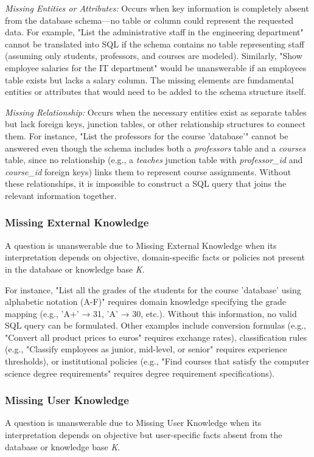 \textit{Missing Entities or Attributes:} Occurs when key information is completely absent from the database schema—no table or column could represent the requested data. For example, "List the administrative staff in the engineering department" cannot be translated into SQL if the schema contains no table representing staff (assuming only students, professors, and courses are modeled). Similarly, "Show employee salaries for the IT department" would be unanswerable if an employees table exists but lacks a salary column. The missing elements are fundamental entities or attributes that would need to be added to the schema structure itself.

\textit{Missing Relationship:} Occurs when the necessary entities exist as separate tables but lack foreign keys, junction tables, or other relationship structures to connect them. For instance, "List the professors for the course 'database'" cannot be answered even though the schema includes both a \textit{professors} table and a \textit{courses} table, since no relationship (e.g., a \textit{teaches} junction table with \textit{professor\_id} and \textit{course\_id} foreign keys) links them to represent course assignments. Without these relationships, it is impossible to construct a SQL query that joins the relevant information together.

\subsubsection{Missing External Knowledge}
A question is unanswerable due to Missing External Knowledge when its interpretation depends on objective, domain-specific facts or policies not present in the database or knowledge base \textit{K}.

For instance, "List all the grades of the students for the course 'database' using alphabetic notation (A-F)" requires domain knowledge specifying the grade mapping (e.g., 'A+' → 31, 'A' → 30, etc.). Without this information, no valid SQL query can be formulated. Other examples include conversion formulas (e.g., "Convert all product prices to euros" requires exchange rates), classification rules (e.g., "Classify employees as junior, mid-level, or senior" requires experience thresholds), or institutional policies (e.g., "Find courses that satisfy the computer science degree requirements" requires degree requirement specifications).

\subsubsection{Missing User Knowledge}
A question is unanswerable due to Missing User Knowledge when its interpretation depends on objective but user-specific facts absent from the database or knowledge base \textit{K}.

